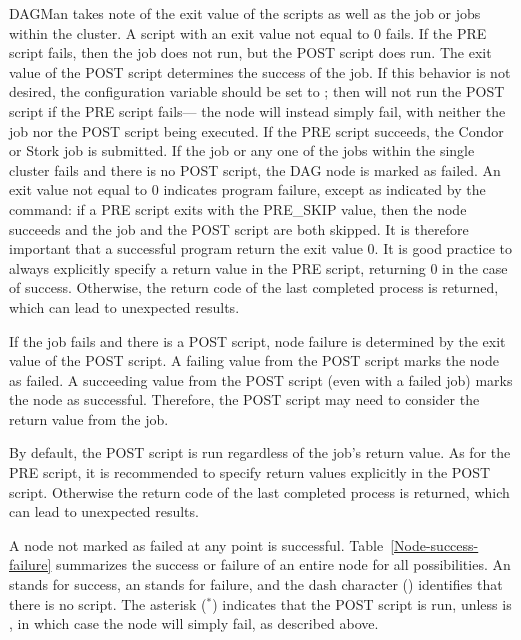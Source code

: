 \begin{itemize}
DAGMan takes note of the exit value of the scripts as well as the job or jobs
within the cluster.  
A script with an exit value not equal to 0 fails.  
If the PRE script fails, 
then the job does not run, but the POST script does run.
The exit value of the POST script determines the success of the job. 
If this behavior is not desired, 
the configuration variable  
should be set to ;
then  will not run the POST script if the PRE script fails---%
the node will instead simply fail, 
with neither the job nor the POST script being executed.
If the PRE script succeeds, the Condor or Stork job is submitted.
If the job or any one of the jobs within the single cluster fails and there is
no POST script, 
the DAG node is marked as failed.  
An exit value not equal to 0 indicates program failure,
except as indicated by the  command:
if a PRE script exits with the PRE\_SKIP value, 
then the node succeeds and the job and the POST script are both skipped.  
It is therefore important that a
successful program return the exit value 0. 
It is good practice to always
explicitly specify a return value in the PRE script,
returning 0 in the case of success.
Otherwise,
the return code of the last completed process is returned,
which can lead to unexpected results. 

If the job fails and there is a POST script,
node failure is determined by the exit value of the POST script.
A failing value from the POST script marks the node as failed.
A succeeding value from the POST script (even with a failed
job) marks the node as successful.
Therefore, the POST script may need to consider the return
value from the job.

By default, the POST script is run regardless of the job's
return value. As for the PRE script, it is recommended to 
specify return values explicitly in the POST script. 
Otherwise the return code of the last completed process 
is returned, which can lead to unexpected results. 

A node not marked as failed at any point is successful.
Table~\ref{Node-success-failure}
summarizes the success or failure of an entire node
for all possibilities.
An  stands for success,
an  stands for failure,
and the dash character (\Arg{-}) identifies that there is no script. The
asterisk (${}^\ast$) indicates that the POST script is run, unless
 is , in which case the node
will simply fail, as described above.


\end{itemize}

